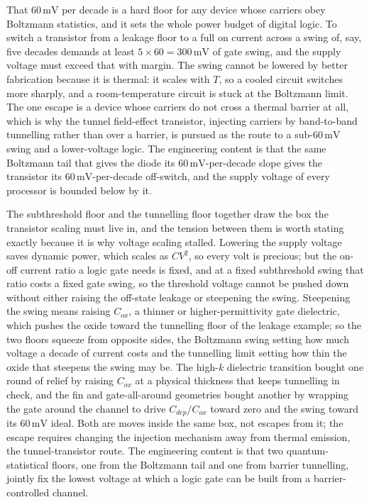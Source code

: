 That $60\,\si{\milli\volt}$ per decade is a hard floor for any device whose
carriers obey Boltzmann statistics, and it sets the whole power budget of
digital logic. To switch a transistor from a leakage floor to a full on
current across a swing of, say, five decades demands at least $5\times 60 =
300\,\si{\milli\volt}$ of gate swing, and the supply voltage must exceed
that with margin. The swing cannot be lowered by better fabrication because
it is thermal: it scales with $T$, so a cooled circuit switches more sharply,
and a room-temperature circuit is stuck at the Boltzmann limit. The one
escape is a device whose carriers do not cross a thermal barrier at all,
which is why the tunnel field-effect transistor, injecting carriers by
band-to-band tunnelling rather than over a barrier, is pursued as the route
to a sub-$60\,\si{\milli\volt}$ swing and a lower-voltage logic. The
engineering content is that the same Boltzmann tail that gives the diode its
$60\,\si{\milli\volt}$-per-decade slope gives the transistor its
$60\,\si{\milli\volt}$-per-decade off-switch, and the supply voltage of every
processor is bounded below by it.

\begin{mastery}
The subthreshold floor and the tunnelling floor together draw the box the
transistor scaling must live in, and the tension between them is worth
stating exactly because it is why voltage scaling stalled. Lowering the
supply voltage saves dynamic power, which scales as $CV^{2}$, so every volt
is precious; but the on-off current ratio a logic gate needs is fixed, and
at a fixed subthreshold swing that ratio costs a fixed gate swing, so the
threshold voltage cannot be pushed down without either raising the off-state
leakage or steepening the swing. Steepening the swing means raising
$C_{ox}$, a thinner or higher-permittivity gate dielectric, which pushes the
oxide toward the tunnelling floor of the leakage example; so the two floors
squeeze from opposite sides, the Boltzmann swing setting how much voltage a
decade of current costs and the tunnelling limit setting how thin the oxide
that steepens the swing may be. The high-$k$ dielectric transition bought
one round of relief by raising $C_{ox}$ at a physical thickness that keeps
tunnelling in check, and the fin and gate-all-around geometries bought
another by wrapping the gate around the channel to drive $C_{dep}/C_{ox}$
toward zero and the swing toward its $60\,\si{\milli\volt}$ ideal. Both are
moves inside the same box, not escapes from it; the escape requires changing
the injection mechanism away from thermal emission, the tunnel-transistor
route. The engineering content is that two quantum-statistical floors, one
from the Boltzmann tail and one from barrier tunnelling, jointly fix the
lowest voltage at which a logic gate can be built from a barrier-controlled
channel.
\end{mastery}

